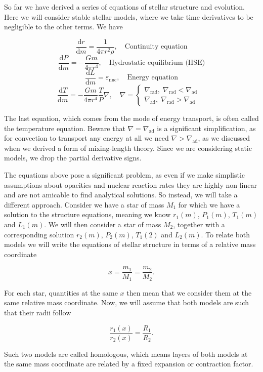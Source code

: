 \documentclass[twocolumn]{article}
\begin{document}
So far we have derived a series of equations of stellar structure and
evolution. Here we will consider stable stellar models, where we take
time derivatives to be negligible to the other terms. We have

\[\frac{\mathrm{d}r}{\mathrm{d}m}=\frac{1}{4\pi r^2\rho},\quad\text{Continuity equation}\]
\[\frac{\mathrm{d}P}{\mathrm{d}m}=-\frac{Gm}{4\pi r^4},\quad\text{Hydrostatic equilibrium (HSE)}\]
\[\frac{\mathrm{d}L}{\mathrm{d}m}=\varepsilon_\mathrm{nuc},\quad\text{Energy equation}\]
\[\frac{\mathrm{d}T}{\mathrm{d}m}=-\frac{Gm}{4\pi r^4}\frac{T}{P}\nabla,\quad
\nabla=\begin{cases}
\nabla_\mathrm{rad},\;\nabla_\mathrm{rad}<\nabla_\mathrm{ad} \\
\nabla_\mathrm{ad},\;\nabla_\mathrm{rad}>\nabla_\mathrm{ad} &
\end{cases}\]

The last equation, which comes from the mode of energy transport, is
often called the temperature equation. Beware that
\(\nabla=\nabla_\mathrm{ad}\) is a significant simplification, as for
convection to transport any energy at all we need
\(\nabla>\nabla_\mathrm{ad}\), as we discussed when we derived a form of
mixing-length theory. Since we are considering static models, we drop
the partial derivative signs.

The equations above pose a significant problem, as even if we make
simplistic assumptions about opacities and nuclear reaction rates they
are highly non-linear and are not amicable to find analytical solutions.
So instead, we will take a different approach. Consider we have a star
of mass \(M_1\) for which we have a solution to the structure equations,
meaning we know \(r_1(m)\), \(P_1(m)\), \(T_1(m)\) and \(L_1(m)\). We
will then consider a star of mass \(M_2\), together with a corresponding
solution \(r_2(m)\), \(P_2(m)\), \(T_1(2)\) and \(L_2(m)\). To relate
both models we will write the equations of stellar structure in terms of
a relative mass coordinate

\[x=\frac{m_1}{M_1}=\frac{m_2}{M_2}.\]

For each star, quantities at the same \(x\) then mean that we consider
them at the same relative mass coordinate. Now, we will assume that both
models are such that their radii follow

\[\frac{r_1(x)}{r_2(x)}=\frac{R_1}{R_2}.\tag{7.1}\]

Such two models are called homologous, which means layers of both models
at the same mass coordinate are related by a fixed expansion or
contraction factor.
\end{document}
